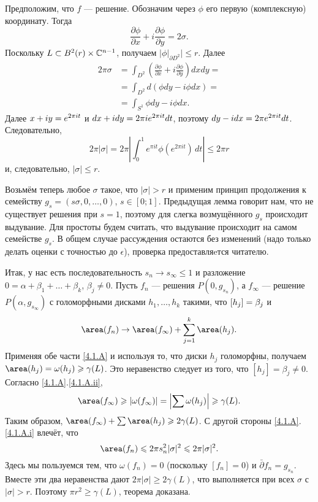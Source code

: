 Предположим, что $f$ — решение.
Обозначим через $\phi$ его первую (комплексную) координату.
Тогда 
\[\frac{\partial\phi}{\partial x}+i\frac{\partial\phi}{\partial y} = 2\sigma.\]
Поскольку $L \subset B^2 (r) \times \mathbb{C}^{n-1}$, получаем $\bigl|\phi|_{\partial D^2}\bigr|\le r$.
Далее
\begin{align*}
2\pi\sigma &= \int_{D^2}\left(\frac{\partial\phi}{\partial x}+i\frac{\partial\phi}{\partial y}\right)dxdy =
\\
&=\int_{D^2} d (\phi dy - i\phi dx)  = 
\\
&=\int_{S^1}\phi dy - i\phi dx.
\end{align*}
Далее $x + iy \z= e^{2\pi i t}$ и $dx + idy \z= 2\pi i e^{2\pi it} dt$, поэтому $dy - idx \z= 2\pi e^{2\pi i t} dt$.
Следовательно,
\[2\pi | \sigma | 
= 
2\pi\left|\int_0^1  e^{\pi i t} \phi(e^{2\pi i t})\,dt\right|
\le
2\pi r \]
и, следовательно, $| \sigma | \le r$.
\qeds


Возьмём теперь любое $\sigma$ такое, что $|\sigma|>r$ и применим принцип продолжения к семейству $g_s = (s\sigma, 0 ,\dots, 0)$, $s \in [0;1]$.
Предыдущая лемма говорит нам, что не существует решения при $s = 1$, поэтому для слегка возмущённого $g_s$ происходит выдувание.
Для простоты будем считать, что выдувание происходит на самом семействе $g_s$.
В общем случае рассуждения остаются без изменений (надо только делать оценки с точностью до $\epsilon$), проверка предоставляeтся читателю.

Итак, у нас есть последовательность $s_n \to s_\infty \le 1$ и разложение $0 = \alpha + \beta_1 +\dots+ \beta_k$, $\beta_j \ne 0$.
Пусть $f_n$ — решения $P (0, g_{s_n})$, а $f_\infty$ — решение $P
(\alpha, g_{s_\infty})$ с голоморфными дисками $h_1,\dots,h_k$ такими, что $[h_j] \z= \beta_j$ и
\[\area (f_n)
\to 
\area (f_\infty) + \sum_{j=1}^k\area (h_j).\]
Применяя обе части \ref{4.1.A} и используя то, что диски $h_j$
голоморфны, получаем
$\area (h_j) = \omega (h_j) \ge \gamma (L)$.
Это неравенство следует из того, что $[h_j] = \beta_j \ne 0$.
Согласно \ref{4.1.A}.\ref{4.1.A.ii},
\[\area (f_\infty)
\ge
|\omega(f_\infty)|
=
\left|\sum\omega (h_j)\right|
\ge
\gamma(L).\]
Таким образом, $\area (f_\infty) + \sum \area (h_j) \ge 2\gamma (L)$.
С другой стороны \ref{4.1.A}.\ref{4.1.A.i} влечёт, что 
\[\area(f_n)
\le
2\pi s^2_n|\sigma|^2
\le
2\pi|\sigma|^2.
\]
Здесь мы пользуемся тем, что $\omega (f_n) = 0$ (поскольку $[f_n] = 0$) и $\bar\partial f_n=g_{s_n}$.
Вместе эти два неравенства дают $2\pi | \sigma | \ge 2\gamma (L)$, что выполняется при всех $\sigma$ с $| \sigma | > r$.
Поэтому $\pi r^2 \ge \gamma (L)$, теорема доказана.
\qeds

